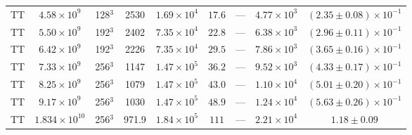 \begin{table}[ht]
\begin{center}
{\begin{tabular}{c c c c c c c c c}
TT	&	$4.58 \times 10^9$		&	128$^3$				&	2530		&	$1.69 \times 10^4$	&	$17.6$			&	---		&	$4.77 \times 10^3$  & $(2.35 \pm 0.08) \times 10^{-1}$ \\
TT	&	$5.50 \times 10^9$		&	192$^3$				&	2402		&	$7.35 \times 10^4$	&	$22.8$			&	---		&	$6.38 \times 10^3$  & $(2.96 \pm 0.11) \times 10^{-1}$ \\
TT	&	$6.42 \times 10^9$		&	192$^3$				&	2226		&	$7.35 \times 10^4$	&	$29.5$			&	---		&	$7.86 \times 10^3$  & $(3.65 \pm 0.16) \times 10^{-1}$ \\
TT	&	$7.33 \times 10^9$		&	256$^3$				&	1147		&	$1.47 \times 10^5$	&	$36.2$			&	---		&	$9.52 \times 10^3$  & $(4.33 \pm 0.17) \times 10^{-1}$ \\
TT	&	$8.25 \times 10^9$		&	256$^3$				&	1079		&	$1.47 \times 10^5$	&	$43.0$			&	---		&	$1.10 \times 10^4$  & $(5.01 \pm 0.20) \times 10^{-1}$ \\
TT	&	$9.17 \times 10^9$		&	256$^3$				&	1030		&	$1.47 \times 10^5$	&	$48.9$			&	---		&	$1.24 \times 10^4$  & $(5.63 \pm 0.26) \times 10^{-1}$ \\
TT	&	$1.834 \times 10^{10}$	&	256$^3$				&	971.9		&	$1.84 \times 10^5$	&	$111$			&	---		&	$2.21 \times 10^4$  & $1.18 \pm 0.09$ \\
\hline																	
\end{tabular}
}
\end{center}
\end{table}


